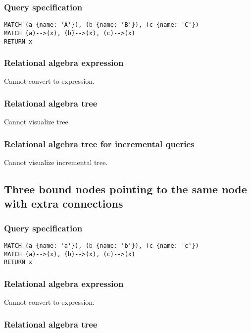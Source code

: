 \subsubsection*{Query specification}

\begin{lstlisting}
MATCH (a {name: 'A'}), (b {name: 'B'}), (c {name: 'C'})
MATCH (a)-->(x), (b)-->(x), (c)-->(x)
RETURN x
\end{lstlisting}

\subsubsection*{Relational algebra expression}

Cannot convert to expression.

\subsubsection*{Relational algebra tree}

Cannot visualize tree.

\subsubsection*{Relational algebra tree for incremental queries}

Cannot visualize incremental tree.

\subsection{Three bound nodes pointing to the same node with extra connections}

\subsubsection*{Query specification}

\begin{lstlisting}
MATCH (a {name: 'a'}), (b {name: 'b'}), (c {name: 'c'})
MATCH (a)-->(x), (b)-->(x), (c)-->(x)
RETURN x
\end{lstlisting}

\subsubsection*{Relational algebra expression}

Cannot convert to expression.

\subsubsection*{Relational algebra tree}


